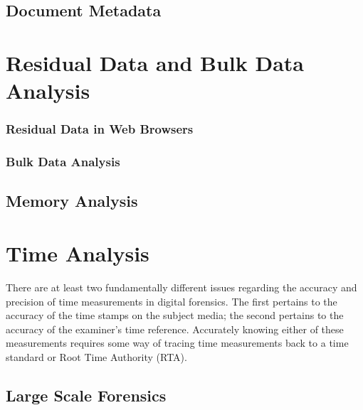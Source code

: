 \documentclass[11pt,letter]{article}
\begin{document}

\section{Document Metadata}
\chapter{Residual Data and Bulk Data Analysis}


\subsection{Residual Data in Web Browsers}
\cite{dfrws2011:JunghoonOhAndSeungbongLeeAndSangjinLee}

\subsection{Bulk Data Analysis}

\cite{dfrws2011:RobertBeverlyAndSimsonGarfinkelAndGregCardwell}
\cite{dfrws2011:RalfBrown}


\section{Memory Analysis}
\cite{dfrws2011:JamesOkolicaAndGilbertPeterson}
\chapter{Time Analysis}

There are at least two
fundamentally different issues regarding the accuracy and precision of
time measurements in digital forensics. The first pertains to the accuracy of
the time stamps on the subject media; the second pertains to the
accuracy of the examiner's time reference. Accurately knowing either
of these measurements requires some way of tracing time measurements
back to a time standard or Root Time Authority (RTA)\cite{dfrws2002:MichaelDuren}.

\cite{dfrws2011:AndrewMarringtonAndIbrahimBaggiliAndGeorgeMohayAndAndrewClark}


\section{Large Scale Forensics}
\end{document}
